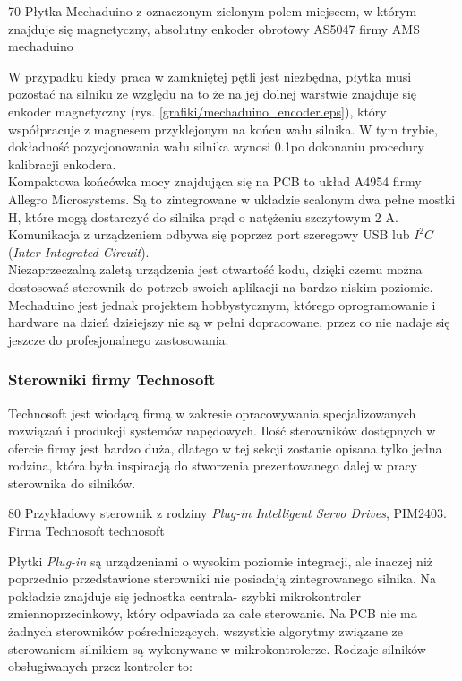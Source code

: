 	{70}
	{Płytka Mechaduino z oznaczonym zielonym polem miejscem, w którym znajduje się magnetyczny, absolutny enkoder obrotowy AS5047 firmy AMS}
	{mechaduino}
	
W przypadku kiedy praca w zamkniętej pętli jest niezbędna, płytka musi pozostać na silniku ze względu na to że na jej dolnej warstwie znajduje się enkoder magnetyczny (rys. \ref{grafiki/mechaduino_encoder.eps}), który współpracuje z magnesem przyklejonym na końcu wału silnika. W tym trybie, dokładność pozycjonowania wału silnika wynosi 0.1\degree po dokonaniu procedury kalibracji enkodera. \\

Kompaktowa końcówka mocy znajdująca się na PCB to układ A4954 firmy Allegro Microsystems. Są to zintegrowane w układzie scalonym dwa pełne mostki H, które mogą dostarczyć do silnika prąd o natężeniu szczytowym 2 A. Komunikacja z urządzeniem odbywa się poprzez port szeregowy USB lub $ I^2C $ ({\it Inter-Integrated Circuit}). \\

Niezaprzeczalną zaletą urządzenia jest otwartość kodu, dzięki czemu można dostosować sterownik do potrzeb swoich aplikacji na bardzo niskim poziomie. Mechaduino jest jednak projektem hobbystycznym, którego oprogramowanie i hardware  na dzień dzisiejszy nie są w pełni dopracowane, przez co nie nadaje się jeszcze do profesjonalnego zastosowania.

\subsubsection{Sterowniki firmy Technosoft}

Technosoft jest wiodącą firmą w zakresie opracowywania specjalizowanych rozwiązań i produkcji systemów napędowych. Ilość sterowników dostępnych w ofercie firmy jest bardzo duża, dlatego w tej sekcji zostanie opisana tylko jedna rodzina, która była inspiracją do stworzenia prezentowanego dalej w pracy sterownika do silników.

	{80}
	{Przykładowy sterownik z rodziny {\it Plug-in Intelligent Servo Drives}, PIM2403. Firma Technosoft}
	{technosoft}
	
Płytki {\it Plug-in} są urządzeniami o wysokim poziomie integracji, ale inaczej niż poprzednio przedstawione sterowniki nie posiadają zintegrowanego silnika. Na pokładzie znajduje się jednostka centrala- szybki mikrokontroler zmiennoprzecinkowy, który odpawiada za całe sterowanie. Na PCB nie ma żadnych sterowników pośredniczących, wszystkie algorytmy związane ze sterowaniem silnikiem są wykonywane w mikrokontrolerze. Rodzaje silników obsługiwanych przez kontroler to:

